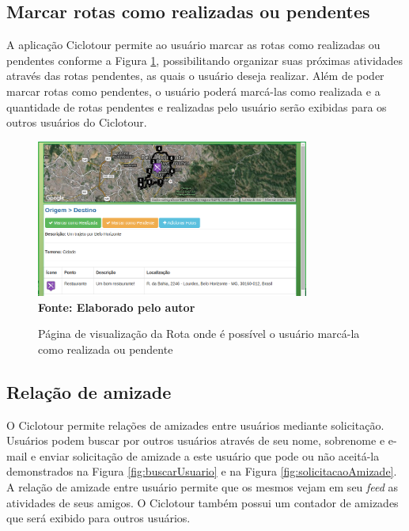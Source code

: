 \subsection{Marcar rotas como realizadas ou pendentes}
A aplicação Ciclotour permite ao usuário marcar as rotas como realizadas ou pendentes conforme a Figura \ref{fig:marcarRota}, possibilitando organizar
suas próximas atividades através das rotas pendentes, as quais o usuário deseja realizar. Além de poder marcar rotas como pendentes, o usuário poderá
marcá-las como realizada e a quantidade de rotas pendentes e realizadas pelo usuário serão exibidas para os outros usuários do Ciclotour.

\begin{figure}[!ht]
	\centering	
	\caption[\hspace{0.1cm} Marcar rotas como realizadas ou pendentes.]
	{Página de visualização da Rota onde é possível o usuário marcá-la como realizada ou pendente}
	  \vspace{-0.4cm}
	\includegraphics[width=0.8\textwidth]{figuras/marcarRota.png}
	 \vspace{0cm}
	\\\textbf{\footnotesize Fonte: Elaborado pelo autor}
	\label{fig:marcarRota}
\end{figure}

\subsection{Relação de amizade}

O Ciclotour permite relações de amizades entre usuários mediante solicitação. Usuários podem buscar por outros usuários através de seu nome, 
sobrenome e e-mail e enviar solicitação de amizade a este usuário que pode ou não aceitá-la demonstrados na Figura \ref{fig:buscarUsuario} e na 
Figura \ref{fig:solicitacaoAmizade}. A relação de amizade entre usuário permite que os mesmos vejam em seu \textit{feed} as atividades de seus amigos. O 
Ciclotour também possui um contador de amizades que será exibido para outros usuários.

